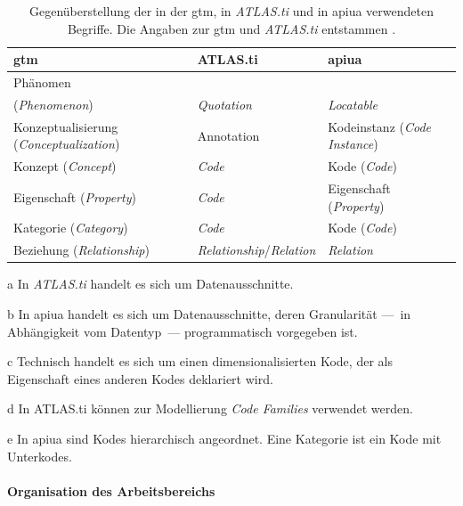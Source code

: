   \begin{table}  	
    \begin{threeparttable}
    \begin{tabularx}{\linewidth}{X X X}
    \textbf{\gls{gtm}} & \textbf{ATLAS.ti} & \textbf{\gls{apiua}} \\
    \midrule
    Phänomen\\(\textit{Phenomenon}) & \textit{Quotation}\tnote{a} & \textit{Locatable}\tnote{b} \\
    Konzeptualisierung (\textit{Conceptualization}) & Annotation & Kodeinstanz (\textit{Code Instance}) \\
    Konzept (\textit{Concept}) & \textit{Code} & Kode (\textit{Code}) \\
    Eigenschaft (\textit{Property}) & \textit{Code} & Eigenschaft\tnote{d} (\textit{Property}) \\
    Kategorie (\textit{Category}) & \textit{Code}\tnote{c} & Kode (\textit{Code})\tnote{e} \\
    Beziehung (\textit{Relationship}) & \textit{Relationship}/\textit{Relation} & \textit{Relation} \\
    \end{tabularx}
    \begin{tablenotes}
      \item[a] In \textit{ATLAS.ti} handelt es sich um Datenausschnitte.
      \item[b] In \gls{apiua} handelt es sich um Datenausschnitte, deren Granularität ---~in Abhängigkeit vom Datentyp~--- programmatisch vorgegeben ist.
      \item[c] Technisch handelt es sich um einen dimensionalisierten Kode, der als Eigenschaft eines anderen Kodes deklariert wird.
      \item[d] In ATLAS.ti können zur Modellierung \textit{Code Families} verwendet werden.
      \item[e] In \gls{apiua} sind Kodes hierarchisch angeordnet. Eine Kategorie ist ein Kode mit Unterkodes.
    \end{tablenotes}
    \end{threeparttable}
    \caption[Gegenüberstellung von GTM-Begriffen]{Gegenüberstellung der in der \gls{gtm}, in \textit{ATLAS.ti} und in \gls{apiua} verwendeten Begriffe. Die Angaben zur \gls{gtm} und  \textit{ATLAS.ti} entstammen \cite{Salinger:2013vd}.}
    \label{tab:terminology}
  \end{table}
  
\paragraph{Organisation des Arbeitsbereichs}

